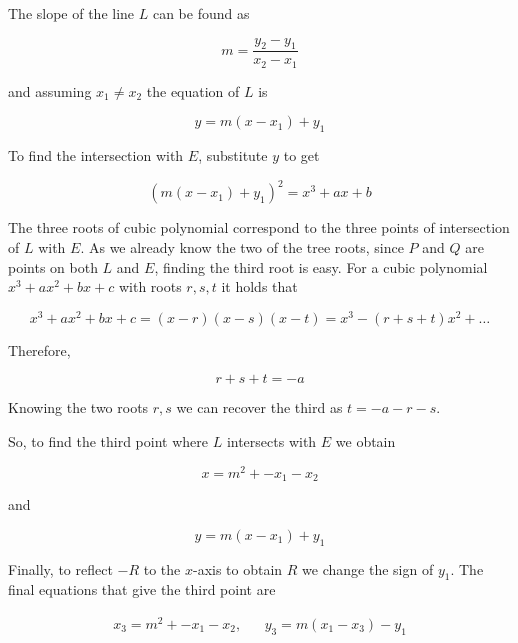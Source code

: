 The slope of the line $L$ can be found as

\begin{equation*}
  m = \dfrac{y_2 - y_1}{x_2 - x_1}
\end{equation*}

and assuming $x_1 \neq x_2$ the equation of $L$ is

\begin{equation*}
  y = m(x - x_1) + y_1
\end{equation*}

To find the intersection with $E$, substitute $y$ to get

\begin{equation*}
  (m(x - x_1) + y_1)^{2} = x^3 + ax + b
\end{equation*}

The three roots of cubic polynomial correspond to the three points of intersection of $L$ with $E$. As we already know the two of the tree roots, since $P$ and $Q$ are points on both $L$ and $E$, finding the third root is easy. For a cubic polynomial $x^{3} + ax^{2} + bx + c$ with roots $r, s, t$ it holds that~\cite{elliptic_curves}

\begin{equation*}
  x^{3} + ax^{2} + bx + c = (x - r)(x - s)(x - t) = x^{3} - (r + s + t)x^{2} + \dots
\end{equation*}

Therefore,

\begin{equation*}
  r + s + t = -a
\end{equation*}

Knowing the two roots $r, s$ we can recover the third as $t = -a - r  - s$.

So, to find the third point where $L$ intersects with $E$ we obtain

\begin{equation*}
  x = m^{2} + - x_1 - x_2
\end{equation*}

and

\begin{equation*}
  y = m(x - x_1) + y_1
\end{equation*}

Finally, to reflect $-R$ to the $x$-axis to obtain $R$ we change the sign of $y_1$. The final equations that give the third point are

\begin{align*}
  x_3 = m^{2} + - x_1 - x_2, && y_3 = m(x_1 - x_3) - y_1
\end{align*}

